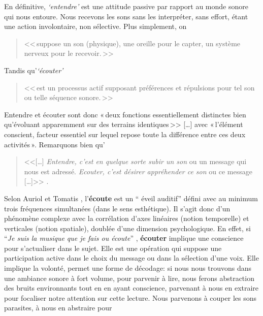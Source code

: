 En définitive, \emph{`entendre'} est une attitude passive par rapport au monde sonore
qui nous entoure. Nous recevons les sons sans les interpréter, sans
effort, étant une action involontaire, non
sélective. Plus simplement, on
\begin{quote}
	<<\,suppose un son (physique), une oreille
	pour le capter, un système nerveux pour le recevoir.\,>>\autocite[2]{auriol:cle}
 \end{quote}
 Tandis qu'\textit{`écouter'}
\begin{quote}
	<<\,est un
	processus actif supposant préférences et répulsions pour tel son ou
	telle séquence sonore.\,>>\autocite[2]{auriol:cle}

\end{quote}
Entendre et écouter sont donc  «\,deux
fonctions essentiellement distinctes bien qu'évoluant apparemment sur
des terrains iden\-ti\-ques\,>>
[\dots] avec «\,l'é\-lé\-ment cons\-cient, facteur essentiel sur lequel repose toute la
différence entre ces deux activités\,». \autocite[122]{tomatis_oreille_1987}
Remarquons bien qu'
\begin{quote}

	<<[\ldots] \emph{Entendre, c'est en quelque sorte subir
		un son} ou un message qui nous est adressé. \emph{Ecouter, c'est désirer appréhender ce son} ou ce message [\ldots]>>
	\autocite [p. 111]{tomatis:education}.
\end{quote}
Selon Auriol \autocite[18] {auriol:cle} et Tomatis \autocite[52]
{tomatis:loreille}, l'\textbf{écoute} est un `` éveil auditif''  défini avec au
minimum trois
fréquences simultanées (dans le sens esthétique). Il s'agit donc d'un phénomène
complexe avec la corrélation d'axes
linéaires (notion temporelle) et verticales (notion spatiale), doublée d'une
dimension psychologique.
En effet, si \enquote{\emph{Je suis la musique que je fais ou écoute}}
\autocite [8]{viret:b}, \textbf{écouter} implique une conscience pour s'actualiser dans le sujet.
Elle est une opération
qui suppose une participation active dans le choix du message
ou dans la sélection d'une voix. Elle  implique la volonté,
permet une forme de décodage:
si nous nous trouvons dans une ambiance sonore à fort volume, pour
parvenir à lire, nous
ferons abstraction des bruits environnants tout en en ayant
conscience, parvenant à nous en extraire pour focaliser notre
attention sur cette lecture. Nous parvenons à couper les sons parasites, à nous en abstraire pour
